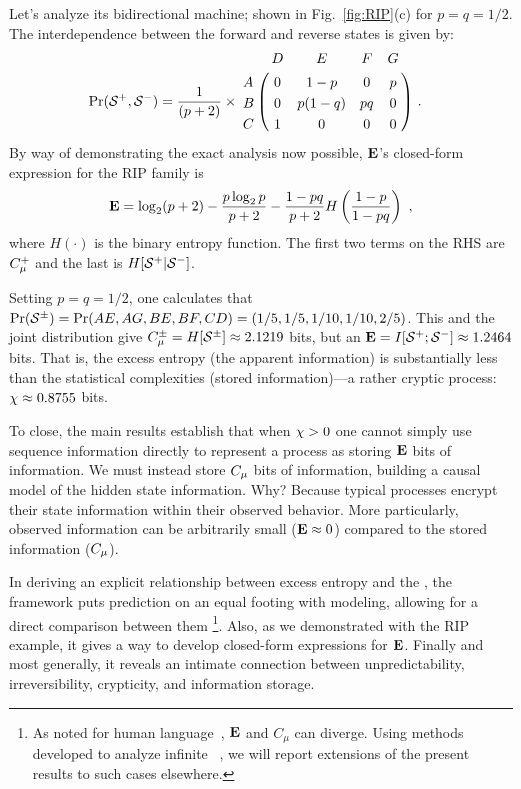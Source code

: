 \documentclass[prl,twocolumn,showpacs,superscriptaddress,preprintnumbers,floatfix]{revtex4}
\theoremstyle{plain}    \newtheorem{Lem}{Lemma}
\theoremstyle{plain}    \newtheorem*{ProLem}{Proof}
\theoremstyle{plain} 	\newtheorem{Cor}{Corollary}
\theoremstyle{plain} 	\newtheorem*{ProCor}{Proof}
\theoremstyle{plain} 	\newtheorem{The}{Theorem}
\theoremstyle{plain} 	\newtheorem*{ProThe}{Proof}
\theoremstyle{plain} 	\newtheorem{Prop}{Proposition}
\theoremstyle{plain} 	\newtheorem*{ProProp}{Proof}
\theoremstyle{plain} 	\newtheorem*{Conj}{Conjecture}
\theoremstyle{plain}	\newtheorem*{Rem}{Remark}
\theoremstyle{plain}	\newtheorem*{Def}{Definition}
\theoremstyle{plain}	\newtheorem*{Not}{Notation}
\begin{document}
Let's analyze its bidirectional machine; shown in Fig.~\ref{fig:RIP}(c) 
for $p = q = 1/2$. The interdependence between the forward
and reverse states is given by:
\vspace{-0.11in}
\begin{align*}
& \Pr(\FutureCausalState, \PastCausalState) = \frac{1}{(p+2)} 
 \times \bordermatrix{
   & D & E & F & G \cr
 A & 0 & 1-p & 0 & p \cr
 B & 0 & p(1-q) & pq & 0 \cr
 C & 1 & 0 & 0 & 0
} ~.
\end{align*}
By way of demonstrating the exact analysis now possible, ${\bf E}$'s closed-form
expression for the RIP family is
\vspace{-0.09in}
\begin{align*}
{\bf E} = \log_2 (p+2) - \frac{p \log_2 p }{p + 2} -
\frac{1-pq}{p + 2} H\left( \frac{1-p}{1-pq}\right) ~,
\end{align*}
where $H(\cdot)$ is the binary entropy function. The first two terms
on the RHS are $C_\mu^+$ and the last is
$H[{\mathcal{S}}^+|{\mathcal{S}}^-]$.

Setting $p = q = 1/2$, one calculates that
${\Pr}({\mathcal{S}}^{\pm}) = {\Pr}(AE,AG,BE,BF,CD) = \left(1/5,1/5,1/10,1/10,2/5\right)$.
This and the joint distribution give
$C_\mu^{\pm} = H[{\mathcal{S}}^{\pm}] \approx 2.1219$ bits,
but an ${\bf E} = I[{\mathcal{S}}^+;{\mathcal{S}}^-] \approx 1.2464$ bits.
That is,
the excess entropy (the apparent information) is substantially less than the
statistical complexities (stored information)---a rather cryptic process:
$\chi \approx 0.8755$ bits.

To close, the main results establish that when \mbox{$\chi > 0$} one cannot
simply use
sequence information directly to represent a process as storing ${\bf E}$ bits
of information. We must instead store ${C_\mu}$ bits of information, building a
causal model of the hidden state information.
Why? Because typical processes encrypt their state information within their
observed behavior. More particularly, observed information can be arbitrarily
small (${\bf E} \approx 0$) compared to the stored information (${C_\mu}$).

In deriving an explicit relationship between excess entropy and the \eM, the
framework puts prediction on an equal footing with modeling, allowing for
a direct comparison between them
\footnote{As noted for human language~\cite{Ebel94c,Debo08a},
${\bf E}$ and $C_\mu$ can diverge. Using methods
developed to analyze infinite \eMs~\cite{Crut01a,CompMechMerge}, we will
report extensions of the present results to such cases elsewhere.}.
Also, as we demonstrated with the RIP example,
it gives a way to develop closed-form expressions for ${\bf E}$.  Finally and most
generally, it reveals an intimate connection between unpredictability,
irreversibility, crypticity, and information storage.
\end{document}
